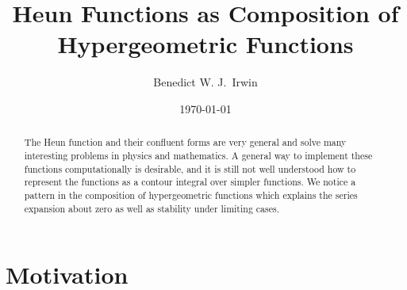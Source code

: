 \documentclass{article}
\title{Heun Functions as Composition of Hypergeometric Functions}
\date{\today}
\begin{document}

\author[1,2]{Benedict W. J.~Irwin}


\maketitle

\begin{abstract}
The Heun function and their confluent forms are very general and solve many interesting problems in physics and mathematics. A general way to implement these functions computationally is desirable, and it is still not well understood how to represent the functions as a contour integral over simpler functions. We notice a pattern in the composition of hypergeometric functions which explains the series expansion about zero as well as stability under limiting cases.
\end{abstract}


\section{Motivation}
\end{document}
